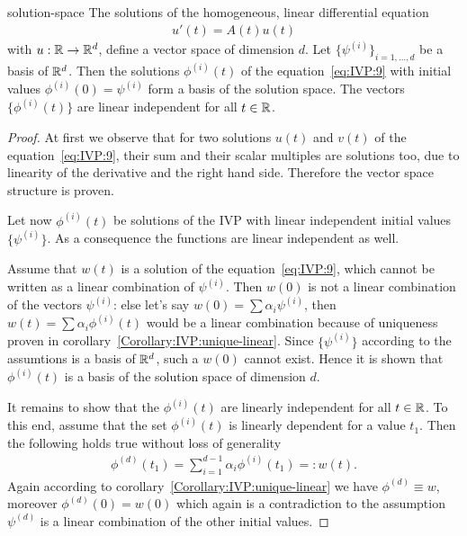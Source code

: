 \begin{Lemma}{solution-space}
  The solutions of the homogeneous, linear differential equation
  \begin{gather}
    \label{eq:IVP:9}
    u'(t) = A(t) u(t)
  \end{gather}
  with $u:\mathbb R\to\mathbb R^d$, define a vector space of dimension $d$. Let
  $\{\psi^{(i)}\}_{i=1,\dots,d}$ be a basis of $\mathbb R^d$. 
	Then the solutions $\phi^{(i)}(t)$ of the equation~\eqref{eq:IVP:9} with 
  initial values $\phi^{(i)}(0) = \psi^{(i)}$ form a basis of the solution
  space. The vectors $\{\phi^{(i)}(t)\}$ are linear independent
  for all $t\in \mathbb R$.
\end{Lemma}


\begin{proof}
  At first we observe that for two solutions $u(t)$ and $v(t)$ of the
  equation~\eqref{eq:IVP:9}, their sum and their scalar multiples are
  solutions too, due to linearity  of the derivative
  and the right hand side.  Therefore the vector space structure is
  proven.
 
  Let now $\phi^{(i)}(t)$ be solutions of the IVP with linear
  independent initial values $\{\psi^{(i)}\}$.  As a consequence the
  functions are linear independent as well.

  Assume that $w(t)$ is a solution of the equation~\eqref{eq:IVP:9},
  which cannot be written as a linear combination of $\psi^{(i)}$.
  Then $w(0)$ is not a linear combination of the vectors $\psi^{(i)}$:
  else let's say $w(0) = \sum \alpha_i \psi^{(i)}$, then
  $w(t) = \sum \alpha_i \phi^{(i)}(t)$ would be a linear combination
  because of uniqueness proven in
  corollary~\ref{Corollary:IVP:unique-linear}.  Since $\{\psi^{(i)}\}$
  according to the assumtions is a basis of $\mathbb R^d$, such a $w(0)$
  cannot exist.  Hence it is shown that $\phi^{(i)}(t)$ is a basis of
  the solution space of dimension $d$.
  
  It remains to show that the $\phi^{(i)}(t)$ are linearly independent
  for all $t\in \mathbb R$. To this end, assume that the set $\phi^{(i)}(t)$
  is linearly dependent for a value $t_1$.  Then the following holds
  true without loss of generality
  \begin{gather*}
    \phi^{(d)}(t_1) = \sum_{i=1}^{d-1}\alpha_i\phi^{(i)}(t_1) =: w(t).
  \end{gather*}
  Again according to corollary~\ref{Corollary:IVP:unique-linear} we
  have $\phi^{(d)} \equiv w$, moreover $\phi^{(d)}(0) = w(0)$ which
  again is a contradiction to the assumption $\psi^{(d)}$ is a linear
  combination of the other initial values.
\end{proof}

